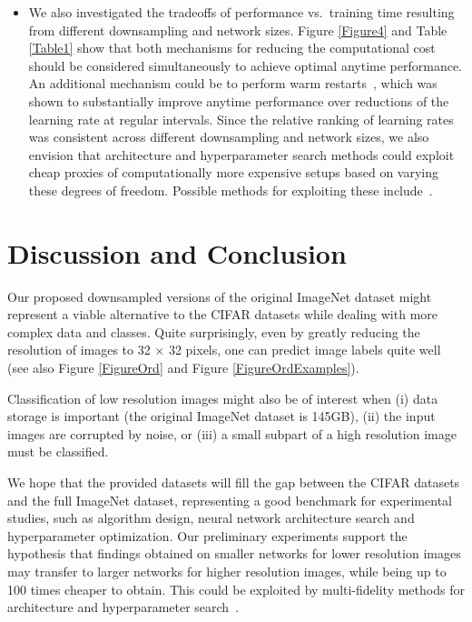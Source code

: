 \documentclass{article} \usepackage{iclr2017_conference,times}
\begin{document}
\begin{itemize}
\item We also investigated the tradeoffs of performance vs.\ training time resulting from different downsampling and network sizes. Figure \ref{Figure4} and Table \ref{Table1} show that both mechanisms for reducing the computational cost should be considered simultaneously to achieve optimal anytime performance. 
An additional mechanism could be to perform warm restarts~\citep{SGDR}, which was shown to substantially improve anytime performance over reductions of the learning rate at regular intervals. Since the relative ranking of learning rates was consistent across different downsampling and network sizes, we also envision that architecture and hyperparameter search methods could exploit cheap proxies of computationally more expensive setups based on varying these degrees of freedom. Possible methods for exploiting these include~\cite{li2016hyperband,klein2016fast}.

\end{itemize}


\afterpage{\clearpage}
\section{Discussion and Conclusion}

Our proposed downsampled versions of the original ImageNet dataset might represent a viable alternative to the CIFAR datasets while dealing with more complex data and classes. Quite surprisingly, even by greatly reducing the resolution of images to 32 $\times$ 32 pixels, one can predict image labels quite well (see also Figure \ref{FigureOrd} and Figure \ref{FigureOrdExamples}). 

Classification of low resolution images might also be of interest when (i) data storage is important (the original ImageNet dataset is 145GB), (ii) the input images are corrupted by noise, or (iii) a small subpart of a high resolution image must be classified. 

We hope that the provided datasets will fill the gap between the CIFAR datasets and the full ImageNet dataset, representing a good benchmark for experimental studies, such as algorithm design, neural network architecture search and hyperparameter optimization. Our preliminary experiments support the hypothesis that findings obtained on smaller networks for lower resolution images may transfer to larger networks for higher resolution images, while being up to 100 times cheaper to obtain. This could be exploited by multi-fidelity methods for architecture and hyperparameter search~\citep{li2016hyperband,klein2016fast}.
\end{document}
